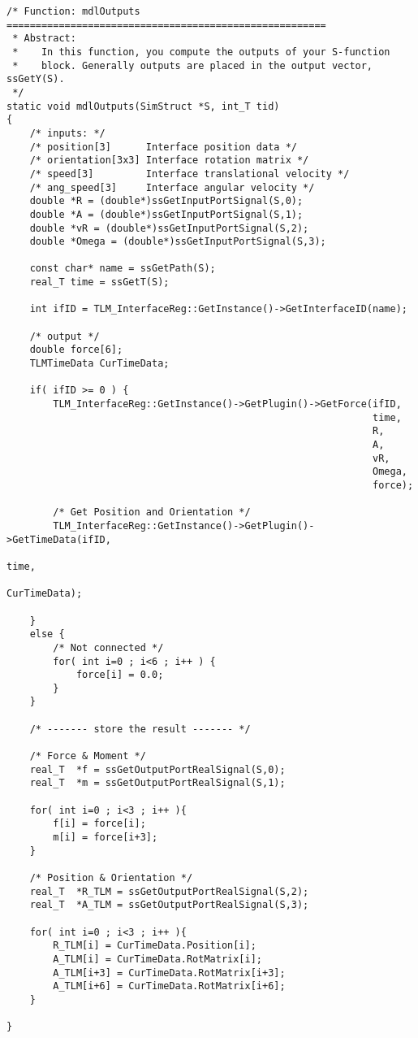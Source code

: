 {\scriptsize
\begin{verbatim}
/* Function: mdlOutputs =======================================================
 * Abstract:
 *    In this function, you compute the outputs of your S-function
 *    block. Generally outputs are placed in the output vector, ssGetY(S).
 */
static void mdlOutputs(SimStruct *S, int_T tid)
{
    /* inputs: */
    /* position[3]      Interface position data */
    /* orientation[3x3] Interface rotation matrix */
    /* speed[3]         Interface translational velocity */
    /* ang_speed[3]     Interface angular velocity */
    double *R = (double*)ssGetInputPortSignal(S,0);
    double *A = (double*)ssGetInputPortSignal(S,1);
    double *vR = (double*)ssGetInputPortSignal(S,2);
    double *Omega = (double*)ssGetInputPortSignal(S,3);

    const char* name = ssGetPath(S);
    real_T time = ssGetT(S);

    int ifID = TLM_InterfaceReg::GetInstance()->GetInterfaceID(name);

    /* output */
    double force[6];
    TLMTimeData CurTimeData;

    if( ifID >= 0 ) {
        TLM_InterfaceReg::GetInstance()->GetPlugin()->GetForce(ifID,
                                                               time,
                                                               R,
                                                               A,
                                                               vR,
                                                               Omega,
                                                               force);

        /* Get Position and Orientation */
        TLM_InterfaceReg::GetInstance()->GetPlugin()->GetTimeData(ifID,
                                                                  time,
                                                                  CurTimeData);

    }
    else {
        /* Not connected */
        for( int i=0 ; i<6 ; i++ ) {
            force[i] = 0.0;
        }
    }

    /* ------- store the result ------- */

    /* Force & Moment */
    real_T  *f = ssGetOutputPortRealSignal(S,0);
    real_T  *m = ssGetOutputPortRealSignal(S,1);

    for( int i=0 ; i<3 ; i++ ){
        f[i] = force[i];
        m[i] = force[i+3];
    }

    /* Position & Orientation */
    real_T  *R_TLM = ssGetOutputPortRealSignal(S,2);
    real_T  *A_TLM = ssGetOutputPortRealSignal(S,3);

    for( int i=0 ; i<3 ; i++ ){
        R_TLM[i] = CurTimeData.Position[i];
        A_TLM[i] = CurTimeData.RotMatrix[i];
        A_TLM[i+3] = CurTimeData.RotMatrix[i+3];
        A_TLM[i+6] = CurTimeData.RotMatrix[i+6];
    }

}
\end{verbatim}
}

